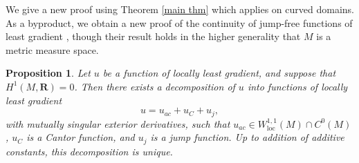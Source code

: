 \documentclass[reqno,11pt]{amsart}
\newcommand{\RR}{\mathbf{R}}
\newcommand{\loc}{\mathrm{loc}}
\newtheorem{proposition}[theorem]{Proposition}
\theoremstyle{definition}
\numberwithin{equation}{section}
\begin{document}
We give a new proof using Theorem \ref{main thm} which applies on curved domains.
As a byproduct, we obtain a new proof of the continuity of jump-free functions of least gradient \cite[Theorem 4.1]{HakkarainenKorteLahtiShanmugalingam+2015}, though their result holds in the higher generality that $M$ is a metric measure space.

\begin{proposition}
Let $u$ be a function of locally least gradient, and suppose that $H^1(M, \RR) = 0$. Then there exists a decomposition of $u$ into functions of locally least gradient
$$u = u_{ac} + u_C + u_j,$$
with mutually singular exterior derivatives, such that $u_{ac} \in W^{1, 1}_\loc(M) \cap C^0(M)$, $u_C$ is a Cantor function, and $u_j$ is a jump function.
Up to addition of additive constants, this decomposition is unique.
\end{proposition}
\end{document}

